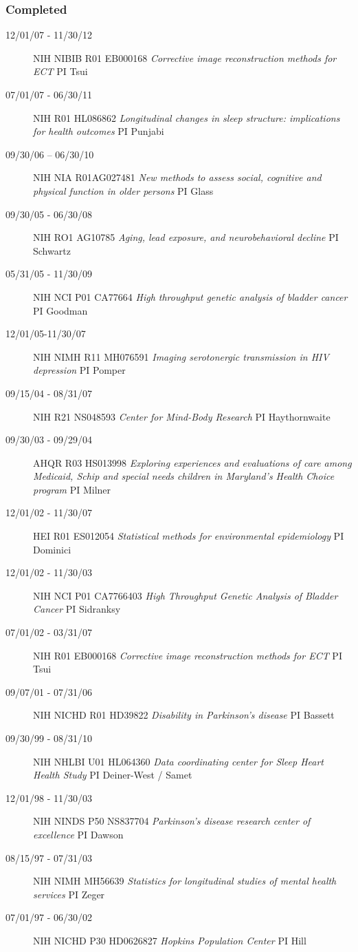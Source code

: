 \documentclass[12pt]{article}
\begin{document}
\subsubsection*{Completed}
\begin{description}
\item[\textnormal{12/01/07 - 11/30/12}] NIH NIBIB R01 EB000168 {\it Corrective image reconstruction methods for ECT} PI Tsui	
\item[\textnormal{07/01/07 - 06/30/11}] NIH R01 HL086862  {\it Longitudinal changes in sleep structure: implications for health outcomes} PI Punjabi 
\item[\textnormal{09/30/06 – 06/30/10}] NIH NIA R01AG027481 {\it New methods to assess social, cognitive and physical function in older persons} PI Glass
\item[\textnormal{09/30/05 - 06/30/08}] NIH RO1 AG10785 {\it Aging, lead exposure, and neurobehavioral decline} PI Schwartz  
\item[\textnormal{05/31/05 - 11/30/09}] NIH NCI P01 CA77664 {\it High throughput genetic analysis of bladder cancer} PI Goodman
\item[\textnormal{12/01/05-11/30/07}] NIH NIMH R11 MH076591 {\it Imaging serotonergic transmission in HIV depression} PI Pomper
\item[\textnormal{09/15/04 - 08/31/07}] NIH R21 NS048593 {\it Center for Mind-Body Research} PI Haythornwaite
\item[\textnormal{09/30/03 - 09/29/04}] AHQR R03 HS013998 {\it Exploring experiences and evaluations of care among Medicaid, Schip and special needs children in Maryland’s Health Choice program} PI Milner
\item[\textnormal{12/01/02 - 11/30/07}] HEI R01 ES012054 {\it Statistical methods for environmental epidemiology} PI Dominici
\item[\textnormal{12/01/02 - 11/30/03}] NIH NCI P01 CA7766403 {\it High Throughput Genetic Analysis of Bladder Cancer} PI Sidranksy
\item[\textnormal{07/01/02 - 03/31/07}] NIH R01 EB000168 {\it Corrective image reconstruction methods for ECT} PI Tsui
\item[\textnormal{09/07/01 - 07/31/06}] NIH NICHD R01 HD39822 {\it Disability in Parkinson’s disease} PI Bassett	
\item[\textnormal{09/30/99 - 08/31/10}] NIH NHLBI U01 HL064360 {\it Data coordinating center for Sleep Heart Health Study} PI Deiner-West / Samet
\item[\textnormal{12/01/98 - 11/30/03}] NIH NINDS P50 NS837704 {\it Parkinson’s disease research center of excellence} PI Dawson	
\item[\textnormal{08/15/97 - 07/31/03}] NIH NIMH MH56639 {\it Statistics for longitudinal studies of mental health services} PI Zeger       
\item[\textnormal{07/01/97 - 06/30/02}] NIH NICHD P30 HD0626827 {\it Hopkins Population Center} PI Hill
\end{description}
\normalsize
\end{document}
